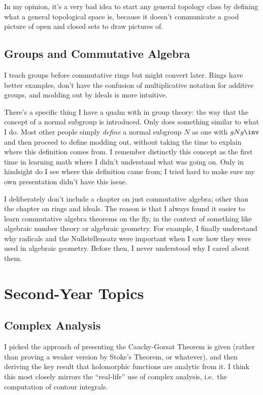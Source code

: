 In my opinion, it's a very bad idea to start any general topology class
by defining what a general topological space is,
because it doesn't communicate a good picture of open and closed sets
to draw pictures of.

\subsection{Groups and Commutative Algebra}
I teach groups before commutative rings but might convert later.
Rings have better examples, don't have the confusion of multiplicative
notation for additive groups, and modding out by ideals is more intuitive.

There's a specific thing I have a qualm with in group theory:
the way that the concept of a normal subgroup is introduced.
Only \cite{ref:gowers} does something similar to what I do.
Most other people simply \emph{define} a normal subgroup $N$
as one with $gNg\inv$ and then proceed to define modding out,
without taking the time to explain where this definition comes from.
I remember distinctly this concept as the first time in learning math
where I didn't understand what was going on.
Only in hindsight do I see where this definition came from;
I tried hard to make sure my own presentation didn't have this issue.

I deliberately don't include a chapter on just commutative algebra;
other than the chapter on rings and ideals.
The reason is that I always found it easier to learn
commutative algebra theorems on the fly,
in the context of something like algebraic number theory or algebraic geometry.
For example, I finally understand why radicals and the Nullstellensatz were important
when I saw how they were used in algebraic geometry.
Before then, I never understood why I cared about them.


\section{Second-Year Topics}
\subsection{Complex Analysis}
I picked the approach of presenting the Cauchy-Gorsat Theorem is given
(rather than proving a weaker version by Stoke's Theorem, or whatever),
and then deriving the key result that holomorphic functions are analytic
from it. I think this most closely mirrors the ``real-life'' use of complex
analysis, i.e.\ the computation of contour integrals.

